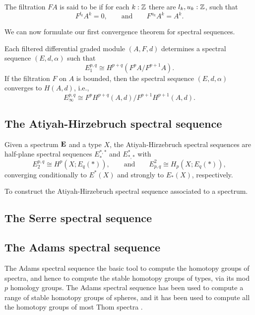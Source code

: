 \documentclass[reqno]{amsart}
\begin{document}
\begin{defn}
The filtration $FA$ is said to be  if for each $k:\mathbb{Z}$ there
are $l_k,u_k:\mathbb{Z}$, such that
\begin{equation*}
F^{l_k}A^k=0,\qquad\text{and}\qquad F^{u_k}A^k=A^k.
\end{equation*}
\end{defn}

We can now formulate our first convergence theorem for spectral sequences.

\begin{thm}
Each filtered differential graded module $(A,F,d)$ determines a spectral sequence
$(E,d,\alpha)$ such that
\begin{equation*}
E_1^{p,q} \cong H^{p+q}(F^pA/F^{p+1}A).
\end{equation*}
If the filtration $F$ on $A$ is bounded, then the spectral sequence $(E,d,\alpha)$
converges to $H(A,d)$, i.e.,
\begin{equation*}
E_{\infty}^{p,q}\cong F^pH^{p+q}(A,d)/F^{p+1}H^{p+1}(A,d).
\end{equation*}
\end{thm}

\subsection{The Atiyah-Hirzebruch spectral sequence}
Given a spectrum $\mathbf{E}$ and a type $X$, the Atiyah-Hirzebruch spectral
sequences are half-plane spectral sequences $E^{\ast,\ast}_\ast$ and $E_{\ast,\ast}^\ast$ with
\begin{equation*}
E^{p,q}_2\cong H^p(X;E_q(\ast)),\qquad\text{and}\qquad E_{p,q}^2\cong H_p(X;E_q(\ast)),
\end{equation*}
converging conditionally to $E^\ast(X)$ and strongly to $E_\ast(X)$, respectively.

\begin{proposal}\label{p:atiyah_hirzebruch_ss}
To construct the Atiyah-Hirzebruch spectral sequence associated to a spectrum.
\end{proposal}

\subsection{The Serre spectral sequence}

\subsection{The Adams spectral sequence}
The Adams spectral sequence the basic tool to compute the homotopy groups of
spectra, and hence to compute the stable homotopy groups of types, via its
mod $p$ homology groups. The Adams spectral sequence has been used to compute
a range of stable homotopy groups of spheres, and it has been used to compute
all the homotopy groups of most Thom spectra \cite{Kochman96}. 
\end{document}
